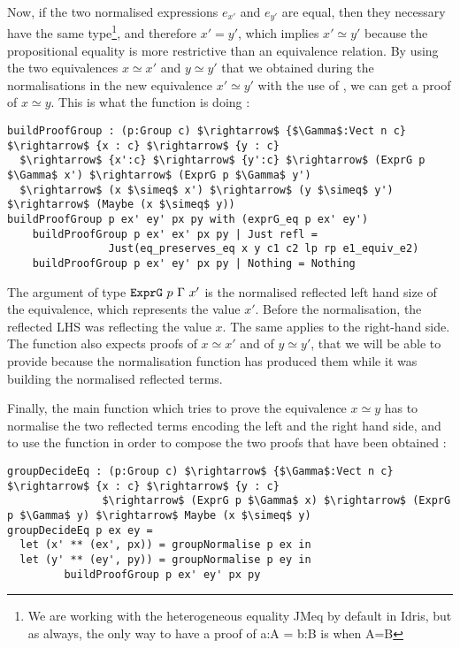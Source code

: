Now, if the two normalised expressions $e_{x'}$ and $e_{y'}$ are equal, then they necessary have the same type\footnote{We are working with the heterogeneous equality JMeq by default in Idris, but as always, the only way to have a proof of a:A = b:B is when A=B}, and therefore $x'=y'$, which implies $x' \simeq y'$ because the propositional equality is more restrictive than an equivalence relation.
By using the two equivalences $x \simeq x'$ and $y \simeq y'$ that we obtained during the normalisations in the new equivalence $x' \simeq y'$ with the use of , we can get a proof of $x \simeq y$. This is what the function  is doing :

\begin{lstlisting}
buildProofGroup : (p:Group c) $\rightarrow$ {$\Gamma$:Vect n c} $\rightarrow$ {x : c} $\rightarrow$ {y : c} 
  $\rightarrow$ {x':c} $\rightarrow$ {y':c} $\rightarrow$ (ExprG p $\Gamma$ x') $\rightarrow$ (ExprG p $\Gamma$ y') 
  $\rightarrow$ (x $\simeq$ x') $\rightarrow$ (y $\simeq$ y') $\rightarrow$ (Maybe (x $\simeq$ y))
buildProofGroup p ex' ey' px py with (exprG_eq p ex' ey')
    buildProofGroup p ex' ex' px py | Just refl = 
                Just(eq_preserves_eq x y c1 c2 lp rp e1_equiv_e2)
    buildProofGroup p ex' ey' px py | Nothing = Nothing
\end{lstlisting}

The argument of type $\code{ExprG}\ p\ \Gamma\ x'$ is the normalised reflected left hand size of the equivalence, which represents the value $x'$. Before the normalisation, the reflected LHS was reflecting the value $x$. The same applies to the right-hand side. The function also expects proofs of $x \simeq x'$ and of $y \simeq y'$, that we will be able to provide because the normalisation function has produced them while it was building the normalised reflected terms.


Finally, the main function which tries to prove the equivalence $x \simeq y$ has to normalise the two reflected terms encoding the left and the right hand side, and to use the function  in order to compose the two proofs that have been obtained :

\begin{lstlisting}
groupDecideEq : (p:Group c) $\rightarrow$ {$\Gamma$:Vect n c} $\rightarrow$ {x : c} $\rightarrow$ {y : c} 
               $\rightarrow$ (ExprG p $\Gamma$ x) $\rightarrow$ (ExprG p $\Gamma$ y) $\rightarrow$ Maybe (x $\simeq$ y)
groupDecideEq p ex ey =
  let (x' ** (ex', px)) = groupNormalise p ex in
  let (y' ** (ey', py)) = groupNormalise p ey in
	     buildProofGroup p ex' ey' px py
\end{lstlisting}


